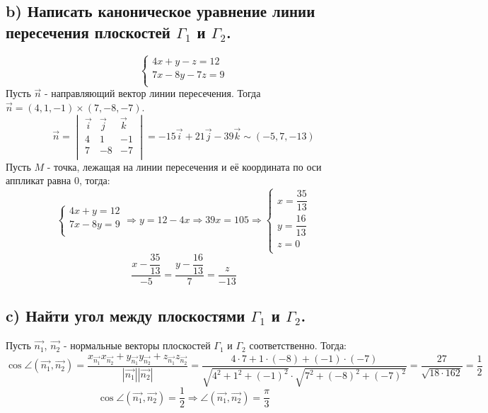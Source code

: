 \documentclass[12pt]{article}
\begin{document}
\begin{sloppypar}
    \subsection{b) Написать каноническое уравнение линии пересечения плоскостей $\Gamma_1$ и $\Gamma_2$.}
    \[
        \left\{\begin{array}{l}
            4x + y - z = 12   \\
            7x - 8 y - 7z = 9 \\
        \end{array}\right.
    \]
    Пусть $\vec{n}$ - направляющий вектор линии пересечения. Тогда $\vec{n} = (4, 1, -1) \times (7, -8, -7)$.
    \[
        \vec{n} =
        \begin{vmatrix}
            \vec i & \vec j & \vec k \\
            4      & 1      & -1     \\
            7      & -8     & -7     \\
        \end{vmatrix}
        = -15 \vec i + 21 \vec j - 39 \vec k \sim (-5, 7, -13)
    \]
    Пусть $M$ - точка, лежащая на линии пересечения и её координата по оси аппликат равна 0, тогда:
    \[
        \left\{\begin{array}{l}
            4x +  y = 12 \\
            7x - 8y = 9  \\
        \end{array}\right.
        \Rightarrow
        y = 12 - 4x
        \Rightarrow
        39x = 105
        \Rightarrow
        \left\{\begin{array}{l}
            x = \dfrac{35}{13} \\
            y = \dfrac{16}{13} \\
            z = 0              \\
        \end{array}\right.
    \]
    \[
        \dfrac{x - \dfrac{35}{13}}{-5} = \dfrac{y - \dfrac{16}{13}}{7} = \dfrac{z}{-13}
    \]

    \subsection{c) Найти угол между плоскостями $\Gamma_1$ и $\Gamma_2$.}
    Пусть $\vec{n_1}$, $\Vec{n_2}$ - нормальные векторы плоскостей $\Gamma_1$ и $\Gamma_2$ соответственно. Тогда:
    \[
        \cos {\angle(\Vec{n_1}, \Vec{n_2}) = \dfrac{x_{\Vec{n_1}} x_{\Vec{n_2}} + y_{\Vec{n_1}} y_{\Vec{n_2}} + z_{\Vec{n_1}} z_{\Vec{n_2}}}{|\Vec{n_1}| |\Vec{n_2}|}}
        = \dfrac{4 \cdot 7 + 1 \cdot (-8) + (-1) \cdot (-7)}{\sqrt{4^2 + 1^2 + (-1)^2} \cdot \sqrt{7^2 + (-8)^2 + (-7)^2}}
        = \dfrac{27}{\sqrt{18 \cdot 162}} = \dfrac{1}{2}
    \]
    \[
        \cos{\angle(\Vec{n_1}, \Vec{n_2})} = \dfrac{1}{2} \Rightarrow \angle(\Vec{n_1}, \Vec{n_2}) = \dfrac{\pi}{3}
    \]


\end{sloppypar}
\end{document}
